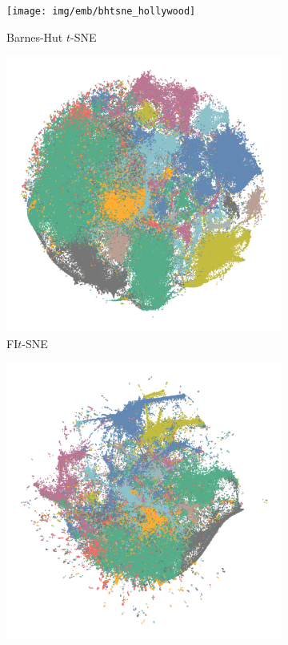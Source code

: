 \begin{appendix}
\begin{figure}[tbp]
  \centering
  \begin{subfigure}{0.45\linewidth}
    \centering
    \texttt{[image: img/emb/bhtsne\_hollywood]}
    \caption{Barnes-Hut $t$-SNE}
  \end{subfigure}
\begin{subfigure}{0.45\linewidth}
  \centering
    \includegraphics[width=\linewidth]{img/emb/fitsne_hollywood}
    \caption{FI$t$-SNE}
\end{subfigure}
\par\bigskip
\begin{subfigure}{0.45\linewidth}
  \centering
    \includegraphics[width=\linewidth]{img/emb/ktsne_hollywood}

\end{subfigure}
\end{figure}
\end{appendix}
